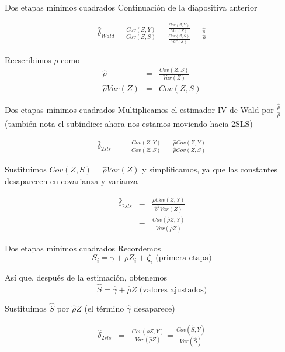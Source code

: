 \documentclass{beamer}
\begin{document}
\begin{frame}{Dos etapas mínimos cuadrados}
    Continuación de la diapositiva anterior
    \bigskip

    \begin{eqnarray*}
        \widehat{\delta}_{Wald} = \frac{Cov(Z,Y)}{Cov(Z,S)} = \frac{\frac{Cov(Z,Y)}{Var(Z)}}{\frac{Cov(Z,S)}{Var(Z)}} = \frac{\widehat{\pi}}{\widehat{\rho}}
    \end{eqnarray*}

    \bigskip

    Reescribimos $\widehat{\rho}$ como
    \begin{eqnarray*}
        \widehat{\rho} &=&  \frac{Cov(Z,S)}{Var(Z)} \\
        \widehat{\rho}Var(Z) &=& Cov(Z,S)
    \end{eqnarray*}
\end{frame}

\begin{frame}{Dos etapas mínimos cuadrados}
    Multiplicamos el estimador IV de Wald por $\frac{\widehat{\rho}}{\widehat{\rho}}$ (también nota el subíndice: ahora nos estamos moviendo hacia 2SLS)

    \begin{eqnarray*}
        \widehat{\delta}_{2sls} &=& \frac{Cov(Z,Y)}{Cov(Z,S)} = \frac{\widehat{\rho}Cov(Z,Y)}{\widehat{\rho}Cov(Z,S)}
    \end{eqnarray*}

    Sustituimos $Cov(Z,S) = \widehat{\rho}Var(Z)$ y simplificamos, ya que las constantes desaparecen en covarianza y varianza

    \begin{eqnarray*}
        \widehat{\delta}_{2sls} &=& \frac{\widehat{\rho}Cov(Z,Y)}{\widehat{\rho}^2Var(Z)}  \\
        &=&\frac{Cov(\widehat{\rho}Z,Y)}{Var(\widehat{\rho}Z)}
    \end{eqnarray*}
\end{frame}

\begin{frame}{Dos etapas mínimos cuadrados}
    Recordemos
    $$ S_i = \gamma + \rho{Z}_i + \zeta_i \text{ (primera etapa)} $$

    Así que, después de la estimación, obtenemos
    $$\widehat{S}=\widehat{\gamma} + \widehat{\rho}Z \text{ (valores ajustados)}$$  

    Sustituimos $\widehat{S}$ por $\widehat{\rho}Z$ (el término $\widehat{\gamma}$ desaparece)

    \begin{eqnarray*}
        \widehat{\delta}_{2sls} &=& \frac{Cov(\widehat{\rho}Z,Y)}{Var(\widehat{\rho}Z)} =  \frac{Cov(\widehat{S},Y)}{Var(\widehat{S})}
    \end{eqnarray*}
\end{frame}
\end{document}
